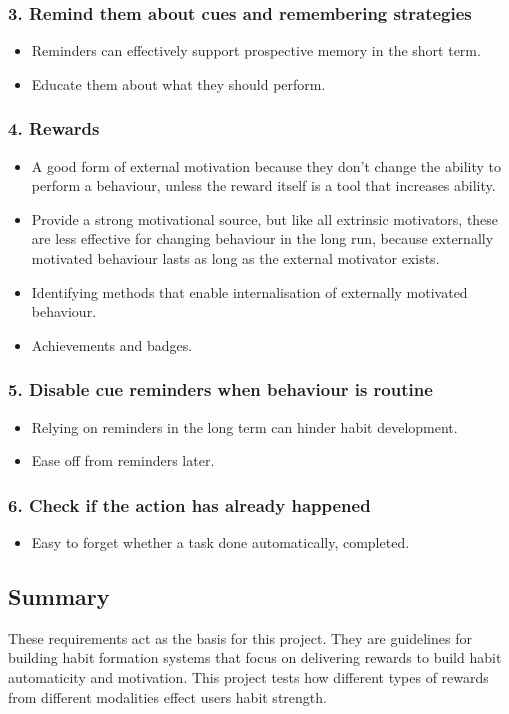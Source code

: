 \subsubsection*{3. Remind them about cues and remembering strategies}
  \begin{itemize}
    \item Reminders can effectively support prospective memory in the short term.
    \item Educate them about what they should perform.
  \end{itemize}

\subsubsection*{4. Rewards}
  \begin{itemize}
    \item A good form of external motivation because they don't change the ability to perform a behaviour, unless the reward itself is a tool that increases ability.
    \item Provide a strong motivational source, but like all extrinsic motivators, these are less effective for changing behaviour in the long run, because externally motivated behaviour lasts as long as the external motivator exists.
    \item Identifying methods that enable internalisation of externally motivated behaviour.
    \item Achievements and badges.
  \end{itemize}

\subsubsection*{5. Disable cue reminders when behaviour is routine}
  \begin{itemize}
    \item Relying on reminders in the long term can hinder habit development.
    \item Ease off from reminders later.
  \end{itemize}

\subsubsection*{6. Check if the action has already happened}
  \begin{itemize}
    \item Easy to forget whether a task done automatically, completed.
  \end{itemize}


\subsection*{Summary}

These requirements act as the basis for this project. They are guidelines for building habit formation systems that focus on delivering rewards to build habit automaticity and motivation. This project tests how different types of rewards from different modalities effect users habit strength.
